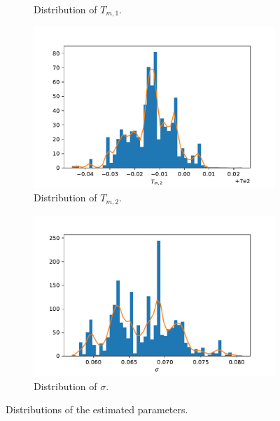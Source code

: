 \begin{figure}[h!]
\begin{subfigure}{.5\textwidth}
  \caption{Distribution of $T_{m,1}$.}
  \label{fig:subhistTm1}
\end{subfigure}%
\begin{subfigure}{.5\textwidth}
  \centering
  \includegraphics[width=\linewidth]{figures/bayesian/SIM/hist_Tm2.pdf}
  \caption{Distribution of $T_{m,2}$.}
  \label{fig:subhistTm2}
\end{subfigure}
\newline
\begin{subfigure}{.5\textwidth}
  \centering
  \includegraphics[width=\linewidth]{figures/bayesian/SIM/hist_sigma.pdf}
  \caption{Distribution of $\sigma$.}
  \label{fig:subhistTm1}
\end{subfigure}%
    \caption{Distributions of the estimated parameters.}%
    \label{fig:DSC_4hist}%
\end{figure}%

